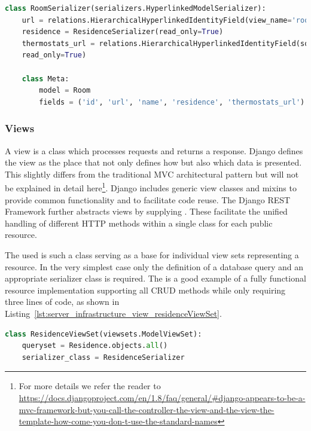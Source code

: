 \begin{lstlisting}[label={lst:server_infrastructure_nested_serializer},language={Python},
caption={The \highlight{RoomSerializer} class as an example of the usage of the \highlight{Hierarchical\allowbreak Hyperlinked\allowbreak IdentityField} and nested serializers.
}]
class RoomSerializer(serializers.HyperlinkedModelSerializer):
	url = relations.HierarchicalHyperlinkedIdentityField(view_name='room-detail', read_only=True)
	residence = ResidenceSerializer(read_only=True)
	thermostats_url = relations.HierarchicalHyperlinkedIdentityField(source='thermostats', view_name='thermostat-list',
	read_only=True)
	
	class Meta:
		model = Room
		fields = ('id', 'url', 'name', 'residence', 'thermostats_url')
\end{lstlisting}

\subsubsection{Views}
\label{sec:server_infrastructure_views}

A view is a class which processes requests and returns a response.
Django defines the view as the place that not only defines how but also which data is presented.
This slightly differs from the traditional MVC architectural pattern but will not be explained in detail here\footnote{For more details we refer the reader to \url{https://docs.djangoproject.com/en/1.8/faq/general/\#django-appears-to-be-a-mvc-framework-but-you-call-the-controller-the-view-and-the-view-the-template-how-come-you-don-t-use-the-standard-names}}.
Django includes generic view classes and mixins to provide common functionality and to facilitate code reuse.
The Django REST Framework further abstracts views by supplying .
These  facilitate the unified handling of different HTTP methods within a single class for each public resource.

The used  is such a class serving as a base for individual view sets representing a resource.
In the very simplest case only the definition of a database query and an appropriate serializer class is required.
The  is a good example of a fully functional resource implementation supporting all CRUD methods while only requiring three lines of code, as shown in Listing~\ref{lst:server_infrastructure_view_residenceViewSet}.

\begin{lstlisting}[label={lst:server_infrastructure_view_residenceViewSet},language={Python},
caption={The \highlight{ResidenceViewSet} class.
}]
class ResidenceViewSet(viewsets.ModelViewSet):
	queryset = Residence.objects.all()
	serializer_class = ResidenceSerializer
\end{lstlisting}


